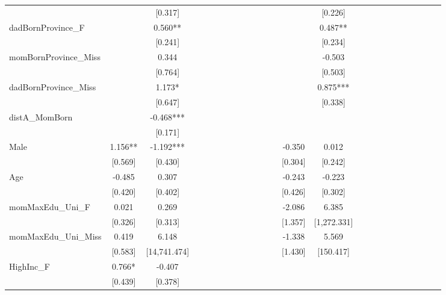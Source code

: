 \begin{tabular}{lcccccccccccccccccccccccc}
 &  & [0.317] &  &  &  &  &  &  &  &  &  &  &  & [0.226] &  &  &  &  &  &  &  &  &  &  \\
dadBornProvince\_F &  & 0.560** &  &  &  &  &  &  &  &  &  &  &  & 0.487** &  &  &  &  &  &  &  &  &  &  \\
 &  & [0.241] &  &  &  &  &  &  &  &  &  &  &  & [0.234] &  &  &  &  &  &  &  &  &  &  \\
momBornProvince\_Miss &  & 0.344 &  &  &  &  &  &  &  &  &  &  &  & -0.503 &  &  &  &  &  &  &  &  &  &  \\
 &  & [0.764] &  &  &  &  &  &  &  &  &  &  &  & [0.503] &  &  &  &  &  &  &  &  &  &  \\
dadBornProvince\_Miss &  & 1.173* &  &  &  &  &  &  &  &  &  &  &  & 0.875*** &  &  &  &  &  &  &  &  &  &  \\
 &  & [0.647] &  &  &  &  &  &  &  &  &  &  &  & [0.338] &  &  &  &  &  &  &  &  &  &  \\
distA\_MomBorn &  & -0.468*** &  &  &  &  &  &  &  &  &  &  &  &  &  &  &  &  &  &  &  &  &  &  \\
 &  & [0.171] &  &  &  &  &  &  &  &  &  &  &  &  &  &  &  &  &  &  &  &  &  &  \\
Male & 1.156** & -1.192*** &  &  &  &  &  &  &  &  &  &  & -0.350 & 0.012 &  &  &  &  &  &  &  &  &  &  \\
 & [0.569] & [0.430] &  &  &  &  &  &  &  &  &  &  & [0.304] & [0.242] &  &  &  &  &  &  &  &  &  &  \\
Age & -0.485 & 0.307 &  &  &  &  &  &  &  &  &  &  & -0.243 & -0.223 &  &  &  &  &  &  &  &  &  &  \\
 & [0.420] & [0.402] &  &  &  &  &  &  &  &  &  &  & [0.426] & [0.302] &  &  &  &  &  &  &  &  &  &  \\
momMaxEdu\_Uni\_F & 0.021 & 0.269 &  &  &  &  &  &  &  &  &  &  & -2.086 & 6.385 &  &  &  &  &  &  &  &  &  &  \\
 & [0.326] & [0.313] &  &  &  &  &  &  &  &  &  &  & [1.357] & [1,272.331] &  &  &  &  &  &  &  &  &  &  \\
momMaxEdu\_Uni\_Miss & 0.419 & 6.148 &  &  &  &  &  &  &  &  &  &  & -1.338 & 5.569 &  &  &  &  &  &  &  &  &  &  \\
 & [0.583] & [14,741.474] &  &  &  &  &  &  &  &  &  &  & [1.430] & [150.417] &  &  &  &  &  &  &  &  &  &  \\
HighInc\_F & 0.766* & -0.407 &  &  &  &  &  &  &  &  &  &  &  &  &  &  &  &  &  &  &  &  &  &  \\
 & [0.439] & [0.378] &  &  &  &  &  &  &  &  &  &  &  &  &  &  &  &  &  &  &  &  &  &  \\

\end{tabular}
